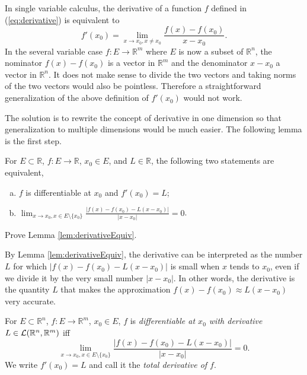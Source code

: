 \begin{rem}
  \label{rem:singleVarDiff2MultiVarDiff}
  In single variable calculus,
  the derivative of a function $f$ defined in (\ref{eq:derivative})
  is equivalent to 
  \begin{displaymath}
    f'(x_0)=\lim_{x\rightarrow x_0, x\ne x_0} \frac{f(x)-f(x_0)}{x-x_0}.
  \end{displaymath}
  In the several variable case $f: E\rightarrow \mathbb{R}^m$
  where $E$ is now a subset of $\mathbb{R}^n$,
  the nominator $f(x)-f(x_0)$ is a vector in $\mathbb{R}^m$
  and the denominator $x-x_0$ a vector in $\mathbb{R}^n$.
  It does not make sense to divide the two vectors and
   taking norms of the two vectors would also be pointless.
  Therefore a straightforward generalization
  of the above definition of $f'(x_0)$ would not work.

  The solution is to rewrite the concept of derivative
  in one dimension so that generalization to multiple dimensions
  would be much easier.
  The following lemma is the first step.
\end{rem}

\begin{lem}
  \label{lem:derivativeEquiv}
  For $E\subset \mathbb{R}$, $f: E\rightarrow \mathbb{R}$,
  $x_0\in E$, and $L\in \mathbb{R}$,
  the following two statements are equivalent,
  \begin{enumerate}[(a)]\itemsep0em
  \item $f$ is differentiable at $x_0$ and $f'(x_0)=L$;
  \item $\lim_{x\rightarrow x_0, x\in E\setminus\{x_0\}} \frac{|f(x)-
      f(x_0) - L(x-x_0)|}{|x-x_0|}=0$.
  \end{enumerate}
\end{lem}

\begin{exc}
  Prove Lemma \ref{lem:derivativeEquiv}.
\end{exc}

\begin{rem}
  By Lemma \ref{lem:derivativeEquiv},
  the derivative can be interpreted as the number $L$
  for which $|f(x)- f(x_0)-L(x-x_0)|$ is small when $x$ tends to $x_0$,
  even if we divide it by the very small number $|x-x_0|$.
  In other words, the derivative is the quantity $L$
  that makes the approximation $f(x)-f(x_0) \approx L(x-x_0)$
  very accurate.
\end{rem}

\begin{defn}
  \label{def:derivativeNdim}
  For $E\subset \mathbb{R}^n$, $f: E\rightarrow \mathbb{R}^m$,
  $x_0\in E$, $f$ is \emph{differentiable at $x_0$ with derivative}
  $L\in{\cal L}(\mathbb{R}^n,\mathbb{R}^m)$
  iff 
  \begin{equation}
    \label{eq:derivativeNdim}
    \lim_{x\rightarrow x_0, x\in E\setminus\{x_0\}}
    \frac{|f(x)- f(x_0) - L(x-x_0)|}{|x-x_0|}=0. 
  \end{equation}
  We write $f'(x_0)=L$
  and call it the \emph{total derivative of $f$}.
\end{defn}

